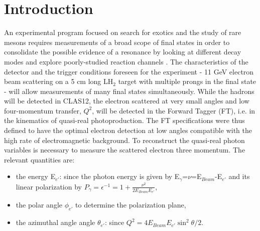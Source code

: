 \section{Introduction}
An experimental program focused on search for exotics and the study of rare mesons requires measurements of a broad scope of final states in order to consolidate the possible evidence of a resonance by looking at different decay modes and explore poorly-studied reaction channels \cite{mesonex}.
The characteristics of the detector and the trigger conditions foreseen for the experiment - 11 GeV electron beam scattering on a 5 cm long LH$_2$ target with multiple prongs in the final state - will allow  measurements of many final states simultaneously. While the hadrons will be detected in CLAS12, the electron scattered at very small angles and low four-momentum transfer, $Q^2$,  will be detected in the Forward Tagger (FT), i.e. in the kinematics of quasi-real photoproduction.
The FT  specifications  were thus defined to have the optimal electron detection at low angles compatible with the high rate of electromagnetic background.
To reconstruct the  quasi-real photon variables is necessary to measure the scattered electron three momentum.
The relevant quantities are:
\begin{itemize}
\item the energy E$_{e'}$: since the photon energy is given by E$_\gamma$=$\nu$=E$_{Beam}$-E$_{e'}$ and its linear polarization
 by $P_\gamma=\epsilon^{-1}=1+\frac{\nu^2}{2 E_{Beam} E_{e'}}$,
\item the polar angle $\phi_{e'}$ to determine the polarization plane, 
\item the azimuthal angle angle $\theta_{e'}$: since $Q^2 = 4 E_{Beam} E_{e'} \sin^2{\theta/2}$.
\end{itemize}

